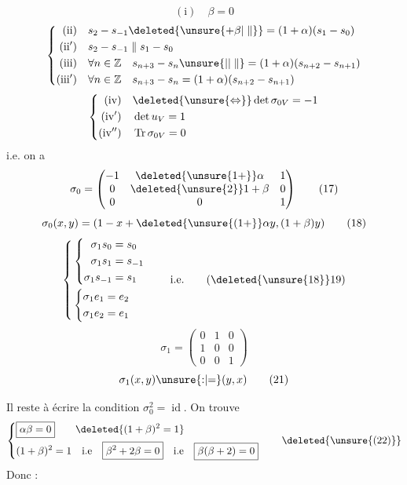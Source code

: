\[ (\mathrm i)\quad \beta=0 \]
\[ \left\{\begin{aligned}(\mathrm{ii})\quad &s_2-s_{-1}\deleted{\unsure{+\beta|\parallel}}=(1+\alpha)(s_1-s_0)\\
(\mathrm{ii}')\quad &s_2-s_{-1}\parallel s_1-s_0\\
(\mathrm{iii})\quad &\forall n\in\mathbb Z\quad s_{n+3}-s_n\unsure{\vert|\parallel}=(1+\alpha)(s_{n+2}-s_{n+1})\\
(\mathrm{iii}')\quad &\forall n\in\mathbb Z\quad s_{n+3}-s_n=(1+\alpha)(s_{n+2}-s_{n+1})\end{aligned}\right. \]
\[ \left\{\begin{aligned}(\mathrm{iv})\quad &\deleted{\unsure{\Leftrightarrow}}\det\sigma_{0V}=-1\\
(\mathrm{iv}')\quad &\det u_V=1\\
(\mathrm{iv}'')\quad &\operatorname{Tr}\sigma_{0V}=0\end{aligned}\right. \]
i.e. on a
\[ \sigma_0=\begin{pmatrix}-1&\deleted{\unsure{1+}}\alpha&1\\0&\deleted{\unsure{2}}1+\beta&0\\0&0&1\end{pmatrix} \tag*{(17)} \]
\[ \sigma_0(x,y)=(1-x+\deleted{\unsure{(1+}}\alpha y,(1+\beta)y) \tag*{(18)} \]
\[ \left\{\begin{aligned}&\left\{\begin{aligned}\sigma_1s_0&=s_0\\
\sigma_1s_1&=s_{-1}\\
\sigma_1s_{-1}&=s_1\end{aligned}\right.\\
&\left\{\begin{aligned}\sigma_1e_1&=e_2\\
\sigma_1e_2&=e_1\end{aligned}\right.\end{aligned}\right.\qquad\text{i.e.} \tag*{(\deleted{\unsure{18}}19)} \]
\[ \sigma_1=\begin{pmatrix}0&1&0\\1&0&0\\0&0&1\end{pmatrix} \tag*{(20)} \]
\[ \sigma_1(x,y)\unsure{{:}|{=}}(y,x) \tag*{(21)} \]

Il reste à écrire la condition $\sigma_0^2=\operatorname{id}$.
On trouve
\[ \left\{\begin{aligned}&\boxed{\alpha\beta=0}\qquad\deleted{(1+\beta)^2=1}\\
&(1+\beta)^2=1\quad\text{i.e}\quad\boxed{\beta^2+2\beta=0}\quad\text{i.e}\quad\boxed{\beta(\beta+2)=0}\end{aligned}\right. \tag*{\deleted{\unsure{(22)}}} \]
Donc :

